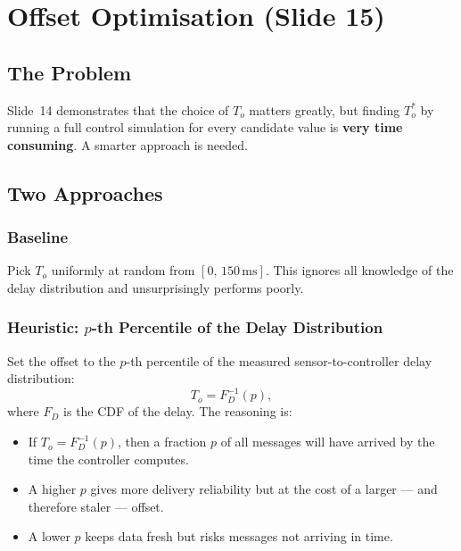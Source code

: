 \section{Offset Optimisation (Slide 15)}
 
\subsection{The Problem}
 
Slide~14 demonstrates that the choice of $T_o$ matters greatly, but finding
$T_o^*$ by running a full control simulation for every candidate value is
\textbf{very time consuming}. A smarter approach is needed.
 
\subsection{Two Approaches}
 
\subsubsection*{Baseline}
 
Pick $T_o$ uniformly at random from $[0,\, 150\,\text{ms}]$. This ignores
all knowledge of the delay distribution and unsurprisingly performs poorly.
 
\subsubsection*{Heuristic: $p$-th Percentile of the Delay Distribution}
 
Set the offset to the $p$-th percentile of the measured sensor-to-controller
delay distribution:
\[
  T_o = F_D^{-1}(p),
\]
where $F_D$ is the CDF of the delay. The reasoning is:
 
\begin{itemize}[leftmargin=2em]
  \item If $T_o = F_D^{-1}(p)$, then a fraction $p$ of all messages will
        have arrived by the time the controller computes.
  \item A higher $p$ gives more delivery reliability but at the cost of a
        larger --- and therefore staler --- offset.
  \item A lower $p$ keeps data fresh but risks messages not arriving in time.
\end{itemize}
 
